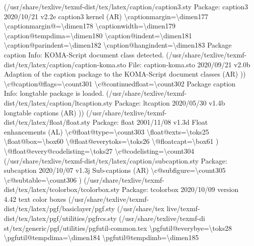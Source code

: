 \documentclass[
  letterpaper,
  DIV=11,
  numbers=noendperiod]{scrartcl}
\newenvironment{Shaded}{\begin{snugshade}}{\end{snugshade}}
\newcommand{\NormalTok}[1]{\textcolor[rgb]{0.00,0.23,0.31}{#1}}
\begin{document}
\begin{Shaded}
\begin{Highlighting}[]
\NormalTok{(/usr/share/texlive/texmf{-}dist/tex/latex/caption/caption3.sty}
\NormalTok{Package: caption3 2020/10/21 v2.2e caption3 kernel (AR)}
\NormalTok{\textbackslash{}captionmargin=\textbackslash{}dimen177}
\NormalTok{\textbackslash{}captionmargin@=\textbackslash{}dimen178}
\NormalTok{\textbackslash{}captionwidth=\textbackslash{}dimen179}
\NormalTok{\textbackslash{}caption@tempdima=\textbackslash{}dimen180}
\NormalTok{\textbackslash{}caption@indent=\textbackslash{}dimen181}
\NormalTok{\textbackslash{}caption@parindent=\textbackslash{}dimen182}
\NormalTok{\textbackslash{}caption@hangindent=\textbackslash{}dimen183}
\NormalTok{Package caption Info: KOMA{-}Script document class detected.}
\NormalTok{(/usr/share/texlive/texmf{-}dist/tex/latex/caption/caption{-}koma.sto}
\NormalTok{File: caption{-}koma.sto 2020/09/21 v2.0b Adaption of the caption package to the }
\NormalTok{KOMA{-}Script document classes (AR)}
\NormalTok{))}
\NormalTok{\textbackslash{}c@caption@flags=\textbackslash{}count301}
\NormalTok{\textbackslash{}c@continuedfloat=\textbackslash{}count302}
\NormalTok{Package caption Info: longtable package is loaded.}
\NormalTok{(/usr/share/texlive/texmf{-}dist/tex/latex/caption/ltcaption.sty}
\NormalTok{Package: ltcaption 2020/05/30 v1.4b longtable captions (AR)}
\NormalTok{)) (/usr/share/texlive/texmf{-}dist/tex/latex/float/float.sty}
\NormalTok{Package: float 2001/11/08 v1.3d Float enhancements (AL)}
\NormalTok{\textbackslash{}c@float@type=\textbackslash{}count303}
\NormalTok{\textbackslash{}float@exts=\textbackslash{}toks25}
\NormalTok{\textbackslash{}float@box=\textbackslash{}box60}
\NormalTok{\textbackslash{}@float@everytoks=\textbackslash{}toks26}
\NormalTok{\textbackslash{}@floatcapt=\textbackslash{}box61}
\NormalTok{)}
\NormalTok{\textbackslash{}@float@every@codelisting=\textbackslash{}toks27}
\NormalTok{\textbackslash{}c@codelisting=\textbackslash{}count304}
\NormalTok{(/usr/share/texlive/texmf{-}dist/tex/latex/caption/subcaption.sty}
\NormalTok{Package: subcaption 2020/10/07 v1.3j Sub{-}captions (AR)}
\NormalTok{\textbackslash{}c@subfigure=\textbackslash{}count305}
\NormalTok{\textbackslash{}c@subtable=\textbackslash{}count306}
\NormalTok{) (/usr/share/texlive/texmf{-}dist/tex/latex/tcolorbox/tcolorbox.sty}
\NormalTok{Package: tcolorbox 2020/10/09 version 4.42 text color boxes}
\NormalTok{(/usr/share/texlive/texmf{-}dist/tex/latex/pgf/basiclayer/pgf.sty (/usr/share/tex}
\NormalTok{live/texmf{-}dist/tex/latex/pgf/utilities/pgfrcs.sty (/usr/share/texlive/texmf{-}di}
\NormalTok{st/tex/generic/pgf/utilities/pgfutil{-}common.tex}
\NormalTok{\textbackslash{}pgfutil@everybye=\textbackslash{}toks28}
\NormalTok{\textbackslash{}pgfutil@tempdima=\textbackslash{}dimen184}
\NormalTok{\textbackslash{}pgfutil@tempdimb=\textbackslash{}dimen185}


\end{Highlighting}
\end{Shaded}
\end{document}
